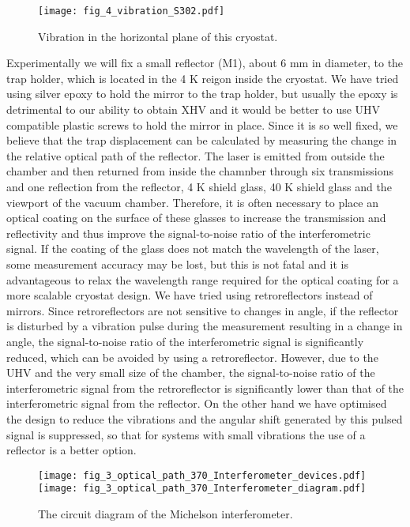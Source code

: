 \begin{figure}
    \centering
    \texttt{[image: fig\_4\_vibration\_S302.pdf]}
    \caption{Vibration in the horizontal plane of this cryostat.}
\end{figure}

Experimentally we will fix a small reflector (M1), about 6 mm in diameter, to the trap holder, which is located in the 4 K reigon inside the cryostat. We have tried using silver epoxy to hold the mirror to the trap holder, but usually the epoxy is detrimental to our ability to obtain XHV and it would be better to use UHV compatible plastic screws to hold the mirror in place. Since it is so well fixed, we believe that the trap displacement can be calculated by measuring the change in the relative optical path of the reflector. The laser is emitted from outside the chamber and then returned from inside the chamnber through six transmissions and one reflection from the reflector, 4 K shield glass, 40 K shield glass and the viewport of the vacuum chamber. Therefore, it is often necessary to place an optical coating on the surface of these glasses to increase the transmission and reflectivity and thus improve the signal-to-noise ratio of the interferometric signal. If the coating of the glass does not match the wavelength of the laser, some measurement accuracy may be lost, but this is not fatal and it is advantageous to relax the wavelength range required for the optical coating for a more scalable cryostat design. We have tried using retroreflectors instead of mirrors. Since retroreflectors are not sensitive to changes in angle, if the reflector is disturbed by a vibration pulse during the measurement resulting in a change in angle, the signal-to-noise ratio of the interferometric signal is significantly reduced, which can be avoided by using a retroreflector. However, due to the UHV and the very small size of the chamber, the signal-to-noise ratio of the interferometric signal from the retroreflector is significantly lower than that of the interferometric signal from the reflector. On the other hand we have optimised the design to reduce the vibrations and the angular shift generated by this pulsed signal is suppressed, so that for systems with small vibrations the use of a reflector is a better option.

\begin{figure}
    \centering
    {\texttt{[image: fig\_3\_optical\_path\_370\_Interferometer\_devices.pdf]}}
    {\texttt{[image: fig\_3\_optical\_path\_370\_Interferometer\_diagram.pdf]}}
    \caption{The circuit diagram of the Michelson interferometer.}
\end{figure}

